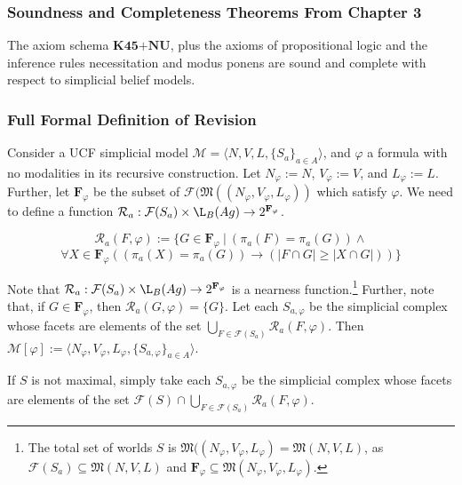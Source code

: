 \documentclass{beamer}
\newcommand{\F}{\mathcal{F}}
\begin{document}
\begin{frame}[fragile]
	\frametitle{Soundness and Completeness Theorems From  Chapter 3}
	\begin{theorem}\label{2Thm:Comp}
		The axiom schema $\textbf{K45+NU}$, plus the axioms of propositional logic and the inference rules necessitation and modus ponens are sound and complete with respect to simplicial belief models.
	\end{theorem}
\end{frame}

\begin{frame}[fragile]
	\frametitle{Full Formal Definition of Revision}
	\begin{definition}
		
		Consider a UCF simplicial model $\mathcal{M}=\langle N,V,L,\{S_a\}_{a\in A}\rangle$, and $\varphi$ a formula with no modalities in its recursive construction. Let  $N_\varphi:=N$, $V_\varphi:=V$, and $L_\varphi:=L$. Further, let $\mathbf{F}_\varphi$ be the subset of $\mathcal{F}(\mathfrak{M}((N_\varphi,V_\varphi,L_\varphi))$ which satisfy $\varphi$. We need to define a function $\mathcal{R}_a:\mathcal{F}(S_a)\times\L_{B}(Ag)\rightarrow2^{\mathbf{F}_\varphi}$.
		
		$$\mathcal{R}_a(F,\varphi):=\{G\in\mathbf{F}_\varphi~|~(\pi_a(F)=\pi_a(G))\wedge$$
		$$\forall X\in\mathbf{F}_\varphi((\pi_a(X)=\pi_a(G))\rightarrow(|F\cap G|\geq|X\cap G|))\}$$
		
		Note that $\mathcal{R}_a:\F(S_a)\times\L_{B}(Ag)\rightarrow 2^{\mathbf{F}_\varphi}$ is a nearness function.\footnote{The total set of worlds $S$ is $\mathfrak{M}((N_\varphi,V_\varphi,L_\varphi)=\mathfrak{M}(N,V,L)$, as $\F(S_a)\subseteq \mathfrak{M}(N,V,L)$ and $\mathbf{F}_\varphi\subseteq\mathfrak{M}(N_\varphi,V_\varphi,L_\varphi)$.} Further, note that, if $G\in\mathbf{F}_\varphi$, then $\mathcal{R}_a(G,\varphi)=\{G\}$. Let each $S_{a,\varphi}$ be the simplicial complex whose facets are elements of the set $\bigcup_{F\in\mathcal{F}(S_a)}\mathcal{R}_a(F,\varphi)$. Then $\mathcal{M}[\varphi]:=\langle N_\varphi,V_\varphi,L_\varphi,\{S_{a,\varphi}\}_{a\in A}\rangle$.
		
		If $S$ is not maximal, simply take each $S_{a,\varphi}$ be the simplicial complex whose facets are elements of the set $\F(S)\cap\bigcup_{F\in\mathcal{F}(S_a)}\mathcal{R}_a(F,\varphi)$.
	\end{definition}
\end{frame}
\end{document}
